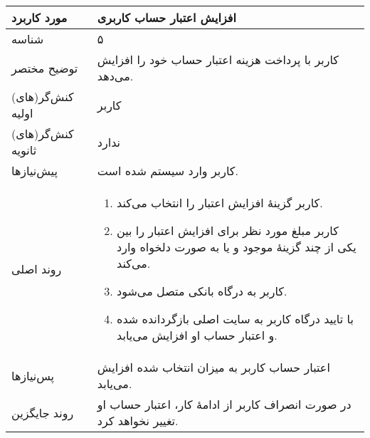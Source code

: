\documentclass{article}
\begin{document}
\begin{center}
\bgroup
\def\arraystretch{1.5}
\begin{tabular} {|p{}|p{}|}
\hline
 مورد کاربرد & 
افزایش اعتبار حساب کاربری
\\ \hline
 شناسه &
۵
\\ \hline
توضیح مختصر &
کاربر با پرداخت هزینه اعتبار حساب خود را افزایش می‌دهد.
\\ \hline
کنش‌گر(های) اولیه &
کاربر
\\ \hline
کنش‌گر(های) ثانویه &
ندارد
\\ \hline
پیش‌نیازها &
کاربر وارد سیستم شده است.
\\ \hline
روند اصلی &
\begin{enumerate}[nosep,topsep=0cm]
\item
کاربر گزینهٔ افزایش اعتبار را انتخاب می‌کند.
\item
کاربر مبلغ مورد نظر برای افزایش اعتبار را بین یکی از چند گزینهٔ موجود و یا به صورت دلخواه وارد می‌کند.
\item
کاربر به درگاه بانکی متصل می‌شود.
\item
با تایید درگاه کاربر به سایت اصلی بازگردانده شده و اعتبار حساب او افزایش می‌یابد.
\end{enumerate}
\\ \hline
پس‌نیازها &
اعتبار حساب کاربر به میزان انتخاب شده افزایش می‌یابد.
\\ \hline
روند جایگزین &
در صورت انصراف کاربر از ادامهٔ کار، اعتبار حساب او تغییر نخواهد کرد.
\\ \hline
\end{tabular}
\egroup
\end{center}

\newpage
\end{document}
